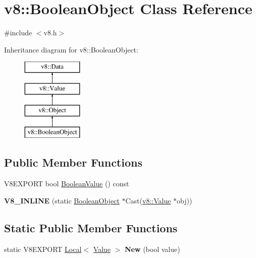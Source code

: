 \hypertarget{classv8_1_1_boolean_object}{}\section{v8\+:\+:Boolean\+Object Class Reference}
\label{classv8_1_1_boolean_object}


{\ttfamily \#include $<$v8.\+h$>$}

Inheritance diagram for v8\+:\+:Boolean\+Object\+:\begin{figure}[H]
\begin{center}
\leavevmode
\includegraphics[height=4.000000cm]{classv8_1_1_boolean_object}
\end{center}
\end{figure}
\subsection*{Public Member Functions}
\begin{DoxyCompactItemize}
\item 
V8\+E\+X\+P\+O\+R\+T bool \hyperlink{classv8_1_1_boolean_object_acd3e4192c2206d9f7f61975fc8f08728}{Boolean\+Value} () const 
\item 
\hypertarget{classv8_1_1_boolean_object_a4cee7bf0cbca6368e052d79b613fc6cb}{}{\bfseries V8\+\_\+\+I\+N\+L\+I\+N\+E} (static \hyperlink{classv8_1_1_boolean_object}{Boolean\+Object} $\ast$Cast(\hyperlink{classv8_1_1_value}{v8\+::\+Value} $\ast$obj))\label{classv8_1_1_boolean_object_a4cee7bf0cbca6368e052d79b613fc6cb}

\end{DoxyCompactItemize}
\subsection*{Static Public Member Functions}
\begin{DoxyCompactItemize}
\item 
\hypertarget{classv8_1_1_boolean_object_a93c15f320fa3922f05ffa16194e26d41}{}static V8\+E\+X\+P\+O\+R\+T \hyperlink{classv8_1_1_local}{Local}$<$ \hyperlink{classv8_1_1_value}{Value} $>$ {\bfseries New} (bool value)\label{classv8_1_1_boolean_object_a93c15f320fa3922f05ffa16194e26d41}

\end{DoxyCompactItemize}


